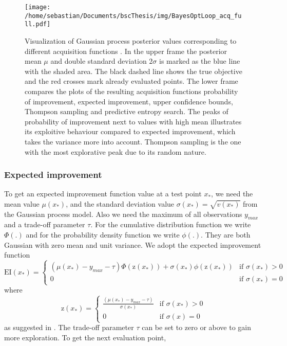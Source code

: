 \begin{figure}[h]
    \centering
    \texttt{[image: /home/sebastian/Documents/bscThesis/img/BayesOptLoop\_acq\_full.pdf]}
    \caption{Visualization of Gaussian process posterior values corresponding to different acquisition functions \cite{shahriari2016taking}. In the upper frame the posterior mean $\mu$ and double standard deviation $2\sigma$ is marked as the blue line with the shaded area. The black dashed line shows the true objective and the red crosses mark already evaluated points. The lower frame compares the plots of the resulting acquisition functions probability of improvement, expected improvement, upper confidence bounds, Thompson sampling and predictive entropy search. The peaks of probability of improvement next to values with high mean illustrates its exploitive behaviour compared to expected improvement, which takes the variance more into account. Thompson sampling is the one with the most explorative peak due to its random nature. \label{fig:acqFcn}}
\end{figure}

\subsubsection{Expected improvement}
To get an expected improvement function value at a test point $x_*$, we need the mean value $\mu(x_*)$, and the standard deviation value $\sigma(x_*) = \sqrt{v(x_*)}$ from the Gaussian process model. Also we need the maximum of all observations $y_{max}$ and a trade-off parameter $\tau$. For the cumulative distribution function we write $\Phi(.)$ and for the probability density function we write $\phi(.)$. They are both Gaussian with zero mean and unit variance. We adopt the expected improvement function
\[
    \mathrm{EI}(x_*)=
\begin{cases}
    (\mu(x_*) - y_{max} - \tau)\Phi(\mathrm{z}(x_*))+\sigma(x_*)\phi(\mathrm{z}(x_*))& \text{if } \sigma(x_*)> 0\\
    0 & \text{if } \sigma(x_*)= 0
\end{cases}
\]
where
\[
    \mathrm{z}(x_*)=
\begin{cases}
    \frac{(\mu(x_*) -y_{max} - \tau)}{\sigma(x_*)} & \text{if } \sigma(x_*)> 0\\
    0 & \text{if } \sigma(x)= 0
\end{cases}
\]
as suggested in \cite{brochu2010tutorial}. The trade-off parameter $\tau$ can be set to zero or above to gain more exploration. To get the next evaluation point,

